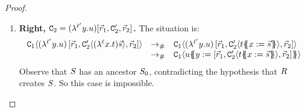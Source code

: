 \begin{proof}
\begin{enumerate}
\begin{enumerate}
  \item {\bf Right, $\mathtt{C}_2 = (\lambda^{\ell'} y. u)[\vec{r}_1,\mathtt{C}'_2,\vec{r}_2]$.}
    The situation is:
    \[
      \begin{array}{rcl}
      \con_1\of{(\lamp{\labtwo}{\vartwo}{\tmthree})\,[\ls{\tmfour}_1,\con'_2\of{(\lamp{\lab}{\var}{\tm})\ls{\tmtwo}},\ls{\tmfour}_2]}
      & \todist &
      \con_1\of{(\lamp{\labtwo}{\vartwo}{\tmthree})\,[\ls{\tmfour}_1,\con'_2\of{\tm\sub{\var}{\ls{\tmtwo}}},\ls{\tmfour}_2]}
      \\
      & \todist &
      \con_1\of{\tmthree\sub{\vartwo}{[\ls{\tmfour}_1,\con'_2\of{\tm\sub{\var}{\ls{\tmtwo}}},\ls{\tmfour}_2]}}
      \end{array}
    \]
    Observe that $S$ has an ancestor $S_0$, contradicting the hypothesis that $R$ creates $S$.
    So this case is impossible.
  \end{enumerate}
\end{enumerate}
\end{proof}
